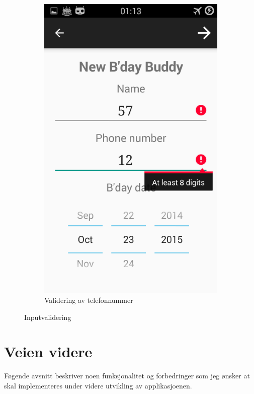 \begin{figure}[ht]
\begin{subfigure}[b]{0.35\textwidth}
        \includegraphics[width=\textwidth]{./img/16.png}
        \caption{Validering av telefonnummer}
        \label{fig:validering_tall}
    \end{subfigure}
    \caption{Inputvalidering}
    \label{fig:validering}
\end{figure}


\chapter{Veien videre}
Føgende avsnitt beskriver noen funksjonalitet og forbedringer som jeg ønsker at skal implementeres under videre utvikling av applikasjoenen. 

